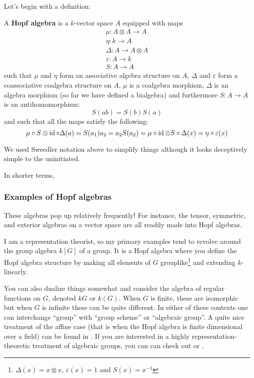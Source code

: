 \documentclass[12pt]{article}
\begin{document}
Let's begin with a definition:
\begin{defn}
	A \textbf{Hopf algebra} is a $k$-vector space $A$ equipped with maps 
	\begin{gather*}
		\mu:A\otimes A\to A\\
		\eta:k\to A\\
		\Delta:A\to A\otimes A\\
		\varepsilon:A\to k\\
		S:A\to A
	\end{gather*}
	such that $\mu$ and $\eta$ form an associative algebra structure on $A$, $\Delta$ and $\varepsilon$ form a coassociative coalgebra structure on $A$,
	$\mu$ is a coalgebra morphism, $\Delta$ is an algebra morphism (so far we have defined a bialgebra) and furthermore $S:A\to A$ is an antihomomorphism:
	\[S(ab)=S(b)S(a)\]
	and such that all the maps satisfy the following:
	\[\mu\circ S\otimes\operatorname{id}\circ \Delta(a)=S(a_1)a_2=a_2S(a_2)=\mu\circ \operatorname{id}\otimes S\circ\Delta(x)=\eta\circ\varepsilon(x)\]
\end{defn}
\begin{rmk}
	We used Sweedler notation above to simplify things although it looks deceptively simple to the uninitiated.
\end{rmk}
\begin{rmk}
	In shorter terms, 
\end{rmk}

\subsubsection{Examples of Hopf algebras}
These algebras pop up relatively frequently! For instance, the tensor, symmetric, and exterior algebras on a vector space are all 
readily made into Hopf algebras.

I am a representation theorist, so my primary examples tend to revolve around 
the group algebra $k[G]$ of a group. It is a Hopf algebra where you define the Hopf algebra structure by making all 
elements of $G$ grouplike\footnote{$\Delta(x)=x\otimes x$, $\varepsilon(x)=1$ and $S(x)=x^{-1}$} and extending $k$-linearly.

You can also dualize things somewhat and consider the algebra of regular functions on $G$, denoted $kG$ or $k(G)$. When $G$ is finite,
these are isomorphic but when $G$ is infinite these can be quite different. In either of these contexts one can interchange ``group''
with ``group scheme'' or ``algebraic group''. A quite nice treatment of the affine case (that is when the Hopf algebra is finite dimensional over a field)
can be found in \cite{waterhouse}. If you are interested in a highly representation-theoretic treatment of algebraic groups, you can can check out \cite{jantzen-algebraic}
or \cite{Milne}.
\end{document}
